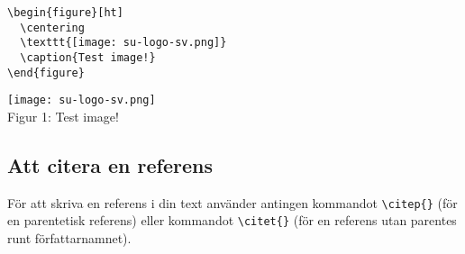 \begin{multicols}{2}

\null \vfill
\noindent\begin{verbatim}
\begin{figure}[ht]
  \centering
  \texttt{[image: su-logo-sv.png]}
  \caption{Test image!}
\end{figure}
\end{verbatim}

\vfill \null
\columnbreak

{
  \centering
  \texttt{[image: su-logo-sv.png]} \\
  \medskip
  Figur 1: Test image! \\
}

\end{multicols}




\subsection{Att citera en referens}

För att skriva en referens i din text använder antingen kommandot
\texttt{\textbackslash{}citep\{\}} (för en parentetisk referens) eller
kommandot \texttt{\textbackslash{}citet\{\}} (för en referens utan parentes
runt författarnamnet).

